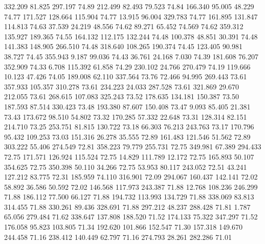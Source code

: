  332.209   81.825  297.197        74.89
 212.499   82.493   79.523        74.84
 166.340   95.005   48.229        74.77
 171.527  128.664  115.904        74.77
  13.915   96.004  329.783        74.77
 161.895  131.847  114.813        74.63
  37.539   24.219   48.556        74.62
  89.271   65.452   74.569        74.62
 359.312  135.927  189.365        74.55
 164.132  112.175  132.244        74.48
 100.378   48.851   30.391        74.48
 141.383  148.905  266.510        74.48
 318.640  108.265  190.374        74.45
 123.405   90.981   38.727        74.45
 355.943    9.187   99.036        74.43
  36.761   24.168    7.030        74.39
 181.608   76.207  352.909        74.33
   6.708  115.392   61.858        74.29
 230.102   24.766  270.479        74.19
 119.666   10.123   47.426        74.05
 189.008   62.110  337.564        73.76
  72.466   94.995  269.443        73.61
 357.933  105.357  310.278        73.61
 234.223   24.033  287.528        73.61
 321.869   29.670  212.055        73.61
 268.615  107.083  325.243        73.52
 178.635  134.181  150.387        73.50
 187.593   87.514  330.423        73.48
 193.380   87.607  150.408        73.47
   9.093   85.405   21.381        73.43
 173.672   98.510   54.802        73.32
 170.285   57.332   22.648        73.31
 128.314   82.151  214.710        73.25
 253.751   81.815  130.722        73.18
  66.303   76.213  243.763        73.17
 170.796   95.432  109.253        73.03
 151.316   26.278   35.555        72.89
 161.483  121.546   51.562        72.89
 303.222   55.406  274.549        72.81
 358.223   79.779  255.731        72.75
 349.981   67.389  294.433        72.75
 171.571  126.924  115.524        72.75
  14.829  111.789   12.172        72.75
 165.893   50.107  354.625        72.75
 350.398   50.110   34.266        72.75
  53.953   80.117  243.052        72.51
  43.241  127.212   83.775        72.31
 185.959   74.110  316.901        72.09
 294.067  160.437  142.141        72.02
  58.892   36.586   50.592        72.02
 146.568  117.973  243.387        71.88
  12.768  108.236  246.299        71.88
 186.112   77.500   66.127        71.88
 194.732  113.993  134.729        71.88
 338.069   83.813  314.455        71.88
 330.261   89.436  328.691        71.88
 297.212   48.237  288.428        71.81
   1.787   65.056  279.484        71.62
 338.647  137.808  188.520        71.52
 174.133   75.322  347.297        71.52
 176.058   95.823  103.805        71.34
 192.620  101.866  152.547        71.30
 157.318  149.670  244.458        71.16
 238.412  140.449   62.797        71.16
 274.793   28.261  282.286        71.01
